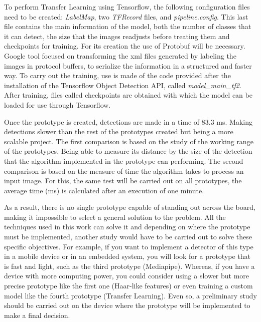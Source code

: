 \vspace{-0.3cm}
To perform Transfer Learning using Tensorflow, the following configuration files need to be created: \textit{LabelMap}, two \textit{TFRecord} files, and \textit{pipeline.config}. This last file contains the main information of the model, both the number of classes that it can detect, the size that the images readjusts before treating them and checkpoints for training. For its creation the use of Protobuf will be necessary. Google tool focused on transforming the xml files generated by labeling the images in protocol buffers, to serialize the information in a structured and faster way. To carry out the training, use is made of the code provided after the installation of the Tensorflow Object Detection API, called \textit{model\_main\_tf2}. After training, files called checkpoints are obtained with which the model can be loaded for use through Tensorflow. 

\vspace{-0.3cm}
Once the prototype is created, detections are made in a time of 83.3 ms. Making detections slower than the rest of the prototypes created but being a more scalable project. The first comparison is based on the study of the working range of the prototypes. Being able to measure its distance by the size of the detection that the algorithm implemented in the prototype can performing. The second comparison is based on the measure of time the algorithm takes to process an input image. For this, the same test will be carried out on all prototypes, the average time (ms) is calculated after an execution of one minute.

\vspace{-0.3cm}
As a result, there is no single prototype capable of standing out across the board, making it impossible to select a general solution to the problem. All the techniques used in this work can solve it and depending on where the prototype must be implemented, another study would have to be carried out to solve these specific objectives. For example, if you want to implement a detector of this type in a mobile device or in an embedded system, you will look for a prototype that is fast and light, such as the third prototype (Mediapipe). Whereas, if you have a device with more computing power, you could consider using a slower but more precise prototype like the first one (Haar-like features) or even training a custom model like the fourth prototype (Transfer Learning). Even so, a preliminary study should be carried out on the device where the prototype will be implemented to make a final decision.


